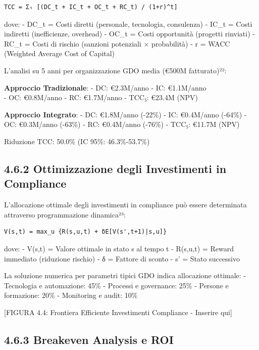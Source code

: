 \documentclass[12pt,a4paper,oneside]{book}
\numberwithin{figure}{chapter} %
\numberwithin{table}{chapter}  %
\begin{document}
\begin{verbatim}
TCC = Σₜ [(DC_t + IC_t + OC_t + RC_t) / (1+r)^t]
\end{verbatim}

dove: - DC\_t = Costi diretti (personale, tecnologia, consulenza) -
IC\_t = Costi indiretti (inefficienze, overhead) - OC\_t = Costi
opportunità (progetti rinviati) - RC\_t = Costi di rischio (sanzioni
potenziali × probabilità) - r = WACC (Weighted Average Cost of Capital)

L'analisi su 5 anni per organizzazione GDO media (€500M fatturato)²²:

\textbf{Approccio Tradizionale}: - DC: €2.3M/anno - IC: €1.1M/anno\\
- OC: €0.8M/anno - RC: €1.7M/anno - TCC₅: €23.4M (NPV)

\textbf{Approccio Integrato}: - DC: €1.8M/anno (-22\%) - IC: €0.4M/anno
(-64\%) - OC: €0.3M/anno (-63\%) - RC: €0.4M/anno (-76\%) - TCC₅: €11.7M
(NPV)

Riduzione TCC: 50.0\% (IC 95\%: 46.3\%-53.7\%)

\subsection{4.6.2 Ottimizzazione degli Investimenti in
Compliance}\label{ottimizzazione-degli-investimenti-in-compliance}

L'allocazione ottimale degli investimenti in compliance può essere
determinata attraverso programmazione dinamica²³:

\begin{verbatim}
V(s,t) = max_u {R(s,u,t) + δE[V(s',t+1)|s,u]}
\end{verbatim}

dove: - V(s,t) = Valore ottimale in stato s al tempo t - R(s,u,t) =
Reward immediato (riduzione rischio) - δ = Fattore di sconto - s' =
Stato successivo

La soluzione numerica per parametri tipici GDO indica allocazione
ottimale: - Tecnologia e automazione: 45\% - Processi e governance: 25\%
- Persone e formazione: 20\% - Monitoring e audit: 10\%

{[}FIGURA 4.4: Frontiera Efficiente Investimenti Compliance - Inserire
qui{]}

\subsection{4.6.3 Breakeven Analysis e
ROI}\label{breakeven-analysis-e-roi}
\end{document}
